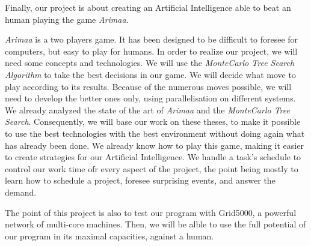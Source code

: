 
Finally, our project is about creating an Artificial Intelligence able to beat an human playing the game \emph{Arimaa}.
\newline

\emph{Arimaa} is a two players game. It has been designed to be difficult to foresee for computers, but easy to play for humans. 
In order to realize our project, we will need some concepts and technologies. 
We will use the \emph{MonteCarlo Tree Search Algorithm} to take the best decisions in our game. We will decide what move to play according to its results. Because of the numerous moves possible, we will need to develop the better ones only, using parallelisation on different systems.
We already analyzed the state of the art of \emph{Arimaa} and the \emph{MonteCarlo Tree Search}. Consequently, we will base our work on these theses, to make it possible to use the best technologies with the best environment without doing again what has already been done.
We already know how to play this game, making it easier to create strategies for our Artificial Intelligence. We handle a task's schedule to control our work time ofr every aspect of the project, the point being mostly to learn how to schedule a project, foresee surprising events, and answer the demand.
\newline

The point of this project is also to test our program with Grid5000, a powerful network of multi-core machines. Then, we will be alble to use the full potential of our program in its maximal capacities, against a human.

